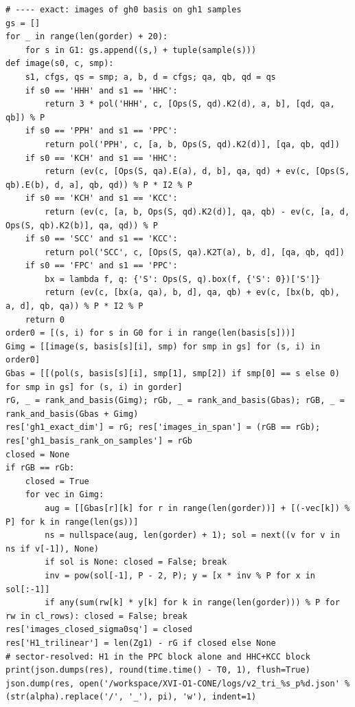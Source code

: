 \documentclass[10pt]{article}
\begin{document}
\begin{lstlisting}
# ---- exact: images of gh0 basis on gh1 samples
gs = []
for _ in range(len(gorder) + 20):
    for s in G1: gs.append((s,) + tuple(sample(s)))
def image(s0, c, smp):
    s1, cfgs, qs = smp; a, b, d = cfgs; qa, qb, qd = qs
    if s0 == 'HHH' and s1 == 'HHC':
        return 3 * pol('HHH', c, [Ops(S, qd).K2(d), a, b], [qd, qa, qb]) % P
    if s0 == 'PPH' and s1 == 'PPC':
        return pol('PPH', c, [a, b, Ops(S, qd).K2(d)], [qa, qb, qd])
    if s0 == 'KCH' and s1 == 'HHC':
        return (ev(c, [Ops(S, qa).E(a), d, b], qa, qd) + ev(c, [Ops(S, qb).E(b), d, a], qb, qd)) % P * I2 % P
    if s0 == 'KCH' and s1 == 'KCC':
        return (ev(c, [a, b, Ops(S, qd).K2(d)], qa, qb) - ev(c, [a, d, Ops(S, qb).K2(b)], qa, qd)) % P
    if s0 == 'SCC' and s1 == 'KCC':
        return pol('SCC', c, [Ops(S, qa).K2T(a), b, d], [qa, qb, qd])
    if s0 == 'FPC' and s1 == 'PPC':
        bx = lambda f, q: {'S': Ops(S, q).box(f, {'S': 0})['S']}
        return (ev(c, [bx(a, qa), b, d], qa, qb) + ev(c, [bx(b, qb), a, d], qb, qa)) % P * I2 % P
    return 0
order0 = [(s, i) for s in G0 for i in range(len(basis[s]))]
Gimg = [[image(s, basis[s][i], smp) for smp in gs] for (s, i) in order0]
Gbas = [[(pol(s, basis[s][i], smp[1], smp[2]) if smp[0] == s else 0) for smp in gs] for (s, i) in gorder]
rG, _ = rank_and_basis(Gimg); rGb, _ = rank_and_basis(Gbas); rGB, _ = rank_and_basis(Gbas + Gimg)
res['gh1_exact_dim'] = rG; res['images_in_span'] = (rGB == rGb); res['gh1_basis_rank_on_samples'] = rGb
closed = None
if rGB == rGb:
    closed = True
    for vec in Gimg:
        aug = [[Gbas[r][k] for r in range(len(gorder))] + [(-vec[k]) % P] for k in range(len(gs))]
        ns = nullspace(aug, len(gorder) + 1); sol = next((v for v in ns if v[-1]), None)
        if sol is None: closed = False; break
        inv = pow(sol[-1], P - 2, P); y = [x * inv % P for x in sol[:-1]]
        if any(sum(rw[k] * y[k] for k in range(len(gorder))) % P for rw in cl_rows): closed = False; break
res['images_closed_sigma0sq'] = closed
res['H1_trilinear'] = len(Zg1) - rG if closed else None
# sector-resolved: H1 in the PPC block alone and HHC+KCC block
print(json.dumps(res), round(time.time() - T0, 1), flush=True)
json.dump(res, open('/workspace/XVI-O1-CONE/logs/v2_tri_%s_p%d.json' % (str(alpha).replace('/', '_'), pi), 'w'), indent=1)
\end{lstlisting}
\end{document}
